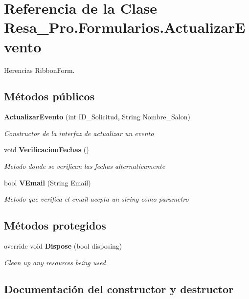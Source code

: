 \section{Referencia de la Clase Resa\+\_\+\+Pro.\+Formularios.\+Actualizar\+Evento}
\label{class_resa___pro_1_1_formularios_1_1_actualizar_evento}


Herencias Ribbon\+Form.

\subsection*{Métodos públicos}
\begin{DoxyCompactItemize}
\item 
{\bf Actualizar\+Evento} (int I\+D\+\_\+\+Solicitud, String Nombre\+\_\+\+Salon)
\begin{DoxyCompactList}\small\item\em Constructor de la interfaz de actualizar un evento \end{DoxyCompactList}\item 
void {\bf Verificacion\+Fechas} ()
\begin{DoxyCompactList}\small\item\em Metodo donde se verifican las fechas alternativamente \end{DoxyCompactList}\item 
bool {\bf V\+Email} (String Email)
\begin{DoxyCompactList}\small\item\em Metodo que verifica el email acepta un string como parametro \end{DoxyCompactList}\end{DoxyCompactItemize}
\subsection*{Métodos protegidos}
\begin{DoxyCompactItemize}
\item 
override void {\bf Dispose} (bool disposing)
\begin{DoxyCompactList}\small\item\em Clean up any resources being used. \end{DoxyCompactList}\end{DoxyCompactItemize}


\subsection{Documentación del constructor y destructor}
